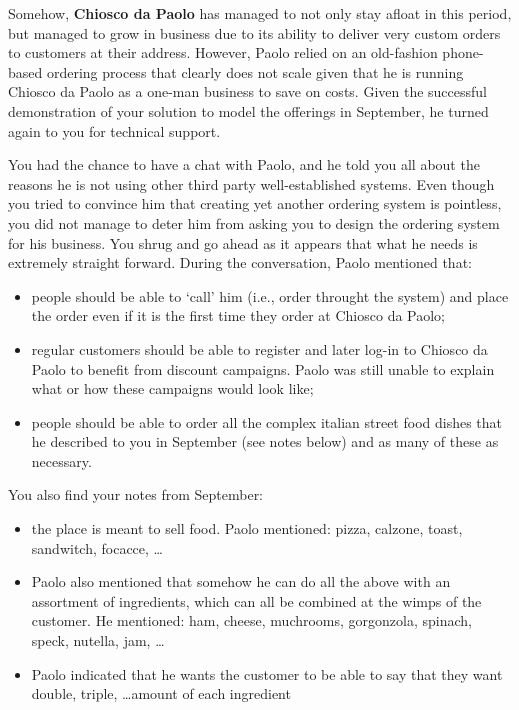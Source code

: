 
\pgfmathsetmacro{}

 Somehow, \textbf{Chiosco da Paolo} has managed to not only stay afloat in this period, but managed to grow in business due to its ability to deliver very custom orders to customers at their address.  However, Paolo relied on an old-fashion phone-based ordering process that clearly does not scale given that he is running Chiosco da Paolo as a one-man business to save on costs.  Given the successful demonstration of your solution to model the offerings in September, he turned again to you for technical support.  

You had the chance to have a chat with Paolo, and he told you all about the reasons he is not using other third party well-established systems.  Even though you tried to convince him that creating yet another ordering system is pointless, you did not manage to deter him from asking you to design the ordering system for his business.  You shrug and go ahead as it appears that what he needs is extremely straight forward.  During the conversation, Paolo mentioned that:
\begin{itemize}
	\item people should be able to `call' him (i.e., order throught the system) and place the order even if it is the first time they order at Chiosco da Paolo;
	\item regular customers should be able to register and later log-in to Chiosco da Paolo to benefit from discount campaigns.  Paolo was still unable to explain what or how these campaigns would look like;
	\item people should be able to order all the complex italian street food dishes that he described to you in September (see notes below) and as many of these as necessary.
	\end{itemize}

You also find your notes from September:
\begin{itemize}
	\item the place is meant to sell food. Paolo mentioned: pizza, calzone, toast, sandwitch, focacce, \ldots
	\item Paolo also mentioned that somehow he can do all the above with an assortment of ingredients, which can all be combined at the wimps of the customer. He mentioned: ham, cheese, muchrooms, gorgonzola, spinach, speck, nutella, jam, \ldots
	\item Paolo indicated that he wants the customer to be able to say that they want double, triple, \ldots amount of each ingredient
	\end{itemize}

